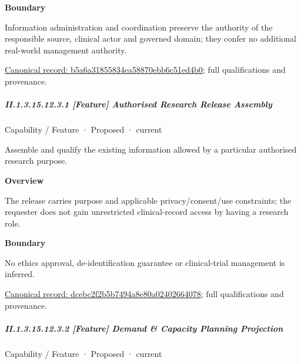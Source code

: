 \textbf{Boundary}



Information administration and coordination preserve the authority of the responsible source, clinical actor and governed domain; they confer no additional real-world management authority.


{\footnotesize \href{../../../../continuum/strategy/capability/b5a6a31855834ea58870ebb6c51ed4b0.md}{Canonical record: b5a6a31855834ea58870ebb6c51ed4b0}; full qualifications and provenance.}\par
\subparagraph*{II.1.3.15.12.3.1 [Feature] Authorised Research Release Assembly}
\label{navigation:II.1.3.15.12.3.1}

\label{element:dcebc2f2b5b7494a8e80a02402664078}
{\small Capability / Feature · Proposed · current}\par

Assemble and qualify the existing information allowed by a particular authorised research purpose.



\textbf{Overview}



The release carries purpose and applicable privacy/consent/use constraints; the requester does not gain unrestricted clinical-record access by having a research role.



\textbf{Boundary}



No ethics approval, de-identification guarantee or clinical-trial management is inferred.


{\footnotesize \href{../../../../continuum/strategy/capability/feature/dcebc2f2b5b7494a8e80a02402664078.md}{Canonical record: dcebc2f2b5b7494a8e80a02402664078}; full qualifications and provenance.}\par
\subparagraph*{II.1.3.15.12.3.2 [Feature] Demand \& Capacity Planning Projection}
\label{navigation:II.1.3.15.12.3.2}

\label{element:4f97baa3aed24b8385bf3ecda4eab622}
{\small Capability / Feature · Proposed · current}\par

